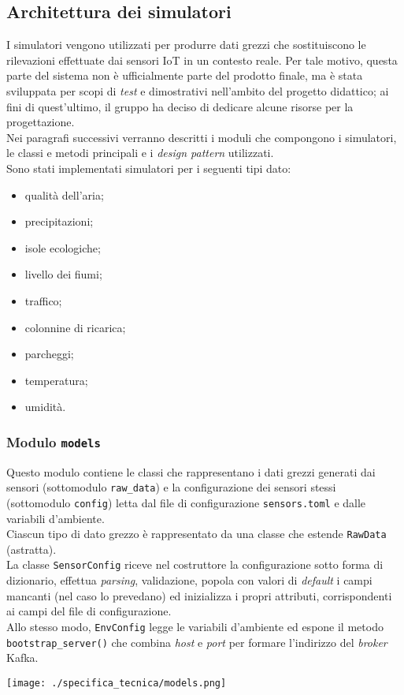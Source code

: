 \subsection{Architettura dei simulatori}
I simulatori vengono utilizzati per produrre dati grezzi che sostituiscono le rilevazioni effettuate dai sensori IoT in un contesto reale.
Per tale motivo, questa parte del sistema non è ufficialmente parte del prodotto finale, ma è stata sviluppata per scopi di \textit{test}
e dimostrativi nell'ambito del progetto didattico; ai fini di quest'ultimo, il gruppo ha deciso di dedicare alcune risorse per la progettazione.\\
Nei paragrafi successivi verranno descritti i moduli che compongono i simulatori, le classi e metodi principali e i \textit{design pattern} utilizzati.\\
Sono stati implementati simulatori per i seguenti tipi dato:
\begin{itemize}
	\item qualità dell'aria;
	\item precipitazioni;
	\item isole ecologiche;
	\item livello dei fiumi;
	\item traffico;
	\item colonnine di ricarica;
	\item parcheggi;
	\item temperatura;
	\item umidità.
\end{itemize}

\subsubsection{Modulo \texttt{models}}
Questo modulo contiene le classi che rappresentano i dati grezzi generati dai sensori (sottomodulo \texttt{raw\_data}) e la configurazione dei sensori stessi (sottomodulo \texttt{config}) letta
dal file di configurazione \texttt{sensors.toml} e dalle variabili d'ambiente.\\
Ciascun tipo di dato grezzo è rappresentato da una classe che estende \texttt{RawData} (astratta).\\
La classe \texttt{SensorConfig} riceve nel costruttore la configurazione sotto forma di dizionario, effettua \textit{parsing}, validazione,
popola con valori di \textit{default} i campi mancanti (nel caso lo prevedano) ed inizializza i propri attributi, corrispondenti ai campi del file di configurazione.\\
Allo stesso modo, \texttt{EnvConfig} legge le variabili d'ambiente ed espone il metodo \\\texttt{bootstrap\_server()} che combina \textit{host} e \textit{port} per formare l'indirizzo del \textit{broker} Kafka.\\
\begin{center}
	\texttt{[image: ./specifica\_tecnica/models.png]}
\end{center}

